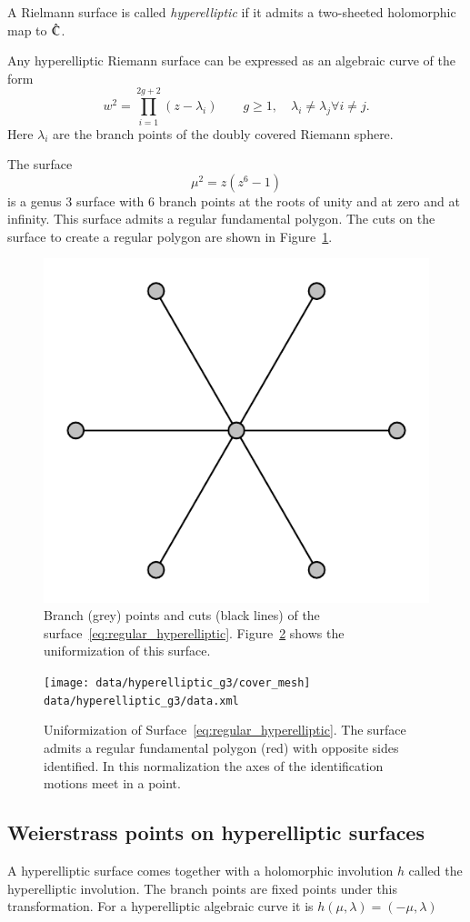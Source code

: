 \documentclass[Thesis.tex]{subfiles}
\begin{document}
\begin{definition}
A Rielmann surface is called \emph{hyperelliptic} if it admits a two-sheeted
holomorphic map to $\hat{\mathbb C}$.  
\end{definition}

Any hyperelliptic Riemann surface can be expressed as an algebraic curve of
the form \[ w^2 = \prod_{i=1}^{2g+2}(z-\lambda_i) \quad\quad g\geq1,\quad
\lambda_i\neq \lambda_j \forall i\neq j.\] Here $\lambda_i$ are the branch
points of the doubly covered Riemann sphere.

\begin{example} 
The surface 
\begin{equation} 
\label{eq:regular_hyperelliptic}
\mu^2=z(z^6-1) 
\end{equation} is a genus $3$ surface with $6$ branch points at
the roots of unity and at zero and at infinity. This surface admits a regular
fundamental polygon.  The cuts on the surface to create a regular polygon are
shown in Figure~\ref{fig:regular_branchdata}.  
\end{example}

\begin{figure}
\centering
\includegraphics[width=0.2\linewidth]{data/hyperelliptic_g3/curve}
\caption{Branch (grey) points and cuts (black lines) of the surface~\ref{eq:regular_hyperelliptic}.
Figure~\ref{fig:regular_cover} shows the uniformization of this surface.}
\label{fig:regular_branchdata}
\end{figure}

\begin{figure} \centering
\texttt{[image: data/hyperelliptic\_g3/cover\_mesh]}
{\scriptsize\tt data/hyperelliptic\_g3/data.xml} 
\caption{Uniformization of Surface~\ref{eq:regular_hyperelliptic}. The surface
admits a regular fundamental polygon (red) with opposite sides identified. In
this normalization the axes of the identification motions meet in a point.}
\label{fig:regular_cover} 
\end{figure}


\subsection{Weierstrass points on hyperelliptic surfaces}
A hyperelliptic surface comes together with a holomorphic involution $h$
called the hyperelliptic involution. The branch points are fixed points under
this transformation. For a hyperelliptic algebraic curve it is $h(\mu,
\lambda)=(-\mu, \lambda)$
\end{document}

